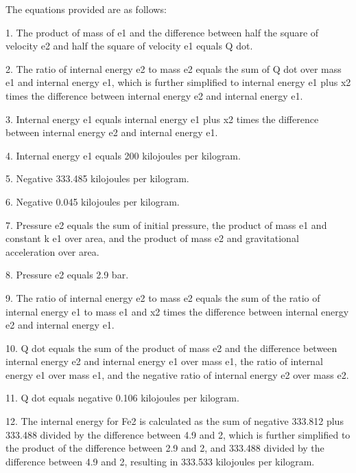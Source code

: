 The equations provided are as follows:

1. The product of mass of e1 and the difference between half the square of velocity e2 and half the square of velocity e1 equals Q dot.

2. The ratio of internal energy e2 to mass e2 equals the sum of Q dot over mass e1 and internal energy e1, which is further simplified to internal energy e1 plus x2 times the difference between internal energy e2 and internal energy e1.

3. Internal energy e1 equals internal energy e1 plus x2 times the difference between internal energy e2 and internal energy e1.

4. Internal energy e1 equals 200 kilojoules per kilogram.

5. Negative 333.485 kilojoules per kilogram.

6. Negative 0.045 kilojoules per kilogram.

7. Pressure e2 equals the sum of initial pressure, the product of mass e1 and constant k e1 over area, and the product of mass e2 and gravitational acceleration over area.

8. Pressure e2 equals 2.9 bar.

9. The ratio of internal energy e2 to mass e2 equals the sum of the ratio of internal energy e1 to mass e1 and x2 times the difference between internal energy e2 and internal energy e1.

10. Q dot equals the sum of the product of mass e2 and the difference between internal energy e2 and internal energy e1 over mass e1, the ratio of internal energy e1 over mass e1, and the negative ratio of internal energy e2 over mass e2.

11. Q dot equals negative 0.106 kilojoules per kilogram.

12. The internal energy for Fe2 is calculated as the sum of negative 333.812 plus 333.488 divided by the difference between 4.9 and 2, which is further simplified to the product of the difference between 2.9 and 2, and 333.488 divided by the difference between 4.9 and 2, resulting in 333.533 kilojoules per kilogram.